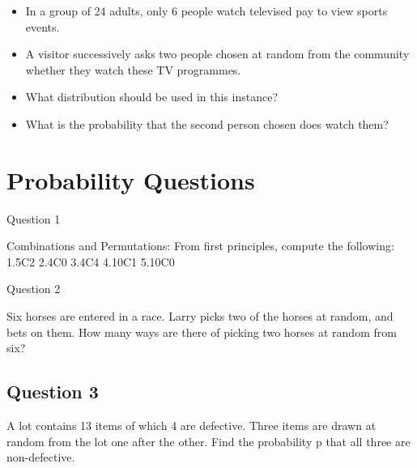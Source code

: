%
%
%
%
%
%
%
%


\begin{itemize}
\item In a group of 24 adults, only 6 people watch televised pay to view
sports events. \item A visitor successively asks two people chosen at random from the
community whether they watch these TV programmes.
\item What distribution should be used in this instance? \item What is the probability
that the second person chosen does watch them?
\end{itemize}


\section{Probability Questions}

Question 1 

Combinations and Permutations: From first principles, compute the following:
1.5C2
2.4C0
3.4C4
4.10C1
5.10C0




Question 2

Six horses are entered in a race. Larry picks two of the horses at random, and bets on them. 
How many ways are there of picking two horses at random from six?






\subsection{Question 3}
A lot contains 13 items of which 4 are defective. Three items are drawn at random from the lot one after the other. Find the probability p that all three are non-defective.





